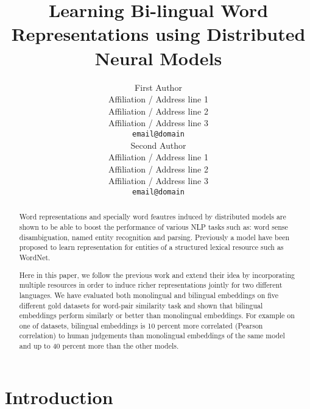 \documentclass[11pt]{article}
\title{Learning Bi-lingual Word Representations using Distributed Neural Models}
\author{First Author \\
  Affiliation / Address line 1 \\
  Affiliation / Address line 2 \\
  Affiliation / Address line 3 \\
  {\tt email@domain} \\\And
  Second Author \\
  Affiliation / Address line 1 \\
  Affiliation / Address line 2 \\
  Affiliation / Address line 3 \\
  {\tt email@domain} \\}
\date{}
\begin{document}
\maketitle
\begin{abstract}
  Word representations and specially word feautres induced by distributed models
  are shown to be able to boost the performance of various NLP tasks such as: 
  word sense disambiguation, named entity recognition and parsing.
  Previously a model have been proposed  to learn
  representation for entities of a structured lexical resource such as WordNet.
  
  Here in this paper, we follow the previous work and extend their idea by
  incorporating multiple resources  in order to induce richer representations jointly for two different languages.  
  We have evaluated both monolingual  and bilingual embeddings on five different gold datasets
for word-pair similarity task and shown that bilingual embeddings perform similarly or better than monolingual embeddings. 
For example on one of datasets, bilingual embeddings is 10 percent more correlated (Pearson correlation) to human judgements  than 
monolingual embeddings of the same model and up to 40 percent more than the other models.

\end{abstract}


\section{Introduction}
\end{document}
